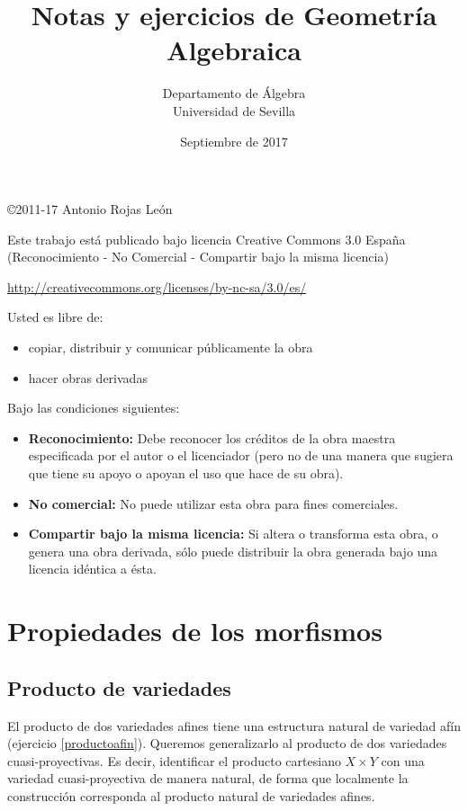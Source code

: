 \documentclass[a4paper,10pt]{book}
\title{Notas y ejercicios de Geometría Algebraica}
\author{Departamento de Álgebra \\ Universidad de Sevilla}
\date{Septiembre de 2017}
\begin{document}
\setcounter{chapter}{3}
\maketitle

\vspace*{\fill}

\copyright{2011-17 Antonio Rojas León}

\bigskip

Este trabajo está publicado bajo licencia Creative Commons 3.0 España (Reconocimiento - No Comercial - Compartir bajo la misma licencia)

\url{http://creativecommons.org/licenses/by-nc-sa/3.0/es/}

\bigskip

Usted es libre de:
\begin{itemize}
 \item copiar, distribuir y comunicar públicamente la obra
\item hacer obras derivadas
\end{itemize}

Bajo las condiciones siguientes:
\begin{itemize}
 \item {\bf Reconocimiento:} Debe reconocer los créditos de la obra maestra especificada por el autor o el licenciador (pero no de una manera que sugiera que tiene su apoyo o apoyan el uso que hace de su obra).
 \item {\bf No comercial:} No puede utilizar esta obra para fines comerciales.
\item {\bf Compartir bajo la misma licencia:} Si altera o transforma esta obra, o genera una obra derivada, sólo puede distribuir la obra generada bajo una licencia idéntica a ésta.
\end{itemize}




\newpage

\chapter{Propiedades de los morfismos}

\section{Producto de variedades}

El producto de dos variedades afines tiene una estructura natural de variedad afín (ejercicio \ref{productoafin}). Queremos generalizarlo al producto de dos variedades cuasi-proyectivas. Es decir, identificar el producto cartesiano $X\times Y$ con una variedad cuasi-proyectiva de manera natural, de forma que localmente la construcción corresponda al producto natural de variedades afines.
\end{document}
